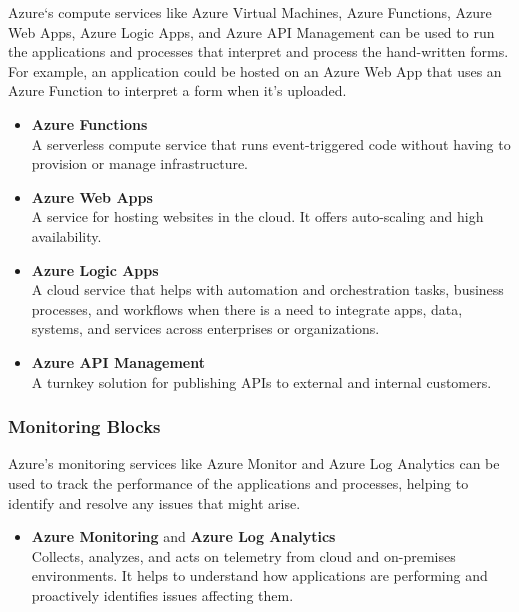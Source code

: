 Azure`s compute services like Azure Virtual Machines,
Azure Functions, Azure Web Apps, Azure Logic Apps,
and Azure API Management can be used to run the applications and processes that interpret and process the hand-written forms.
For example,
an application could be hosted on an Azure Web App that uses an Azure Function to interpret a form when it’s uploaded.

\begin{itemize}
    \item \textbf{Azure Functions}
    \\ A serverless compute service that runs event-triggered code without having to provision or manage infrastructure.

    \item \textbf{Azure Web Apps}
    \\ A service for hosting websites in the cloud. It offers auto-scaling and high availability.

    \item \textbf{Azure Logic Apps}
    \\ A cloud service that helps with automation and orchestration tasks, business processes,
    and workflows when there is a need to integrate apps, data, systems,
    and services across enterprises or organizations.

    \item \textbf{Azure API Management}
    \\ A turnkey solution for publishing APIs to external and internal customers.
\end{itemize}

\subsubsection*{Monitoring Blocks}

Azure’s monitoring services like Azure Monitor and Azure Log Analytics can be used to track the performance of the applications and processes,
helping to identify and resolve any issues that might arise.

\begin{itemize}
    \item \textbf{Azure Monitoring} and \textbf{Azure Log Analytics}
    \\ Collects, analyzes, and acts on telemetry from cloud and on-premises environments.
    It helps to understand how applications are performing and proactively identifies issues affecting them.
\end{itemize}

